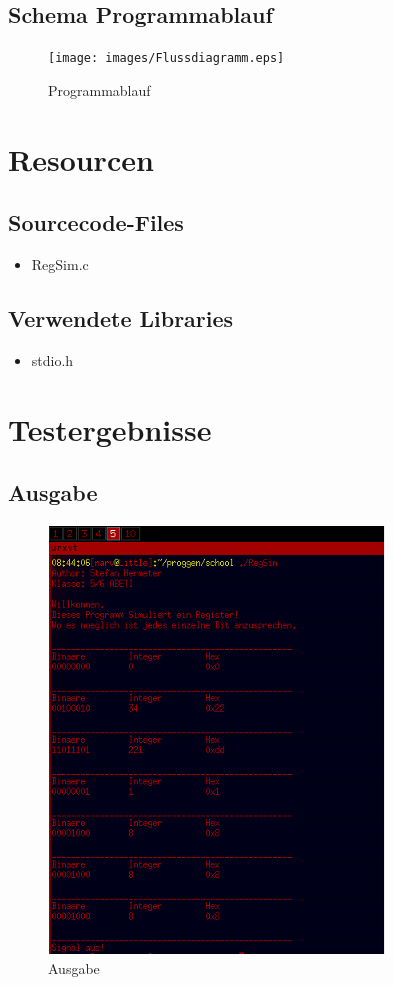 \documentclass{scrartcl}
\begin{document}
\subsection{Schema Programmablauf}
\begin{figure}[H]
  \centering
  \texttt{[image: images/Flussdiagramm.eps]}
  \caption{Programmablauf}
  \label{fig:digraph}
\end{figure}

\section{Resourcen}

\subsection{Sourcecode-Files}
\begin{itemize}
\item RegSim.c
\end{itemize}

\subsection{Verwendete Libraries}
\begin{itemize}
\item stdio.h
\end{itemize}

\section{Testergebnisse}
\subsection{Ausgabe}
\begin{figure}[H]
  \centering
  \includegraphics[width=0.9\linewidth]{images/ausgabe1.png}
  \caption{Ausgabe}
  \label{fig:digraph}
\end{figure} 
\end{document}
